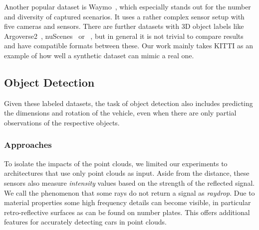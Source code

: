 Another popular dataset is Waymo~\cite{sun_scalability_2020}, which especially stands out for the number and diversity of captured scenarios. It uses a rather complex sensor setup with five cameras and \li sensors. 
There are further datasets with 3D object labels like Argoverse2~\cite{wilson_argoverse_2023}, nuScenes~\cite{caesar_nuscenes_2020} or ~\cite{mao_one_2021}, but in general it is not trivial to compare results and have compatible formats between these. 
Our work mainly takes KITTI as an example of how well a synthetic dataset can mimic a real one.%


\subsection{Object Detection}
Given these labeled datasets, the task of object detection also includes predicting the dimensions and rotation of the vehicle, even when there are only partial observations of the respective objects. 
\subsubsection{Approaches}
To isolate the impacts of the point clouds, we limited our experiments to architectures that use only \li point clouds as input.
Aside from the distance, these sensors also measure \emph{intensity} values based on the strength of the reflected signal.
We call the phenomenon that some rays do not return a signal as \emph{raydrop}.
Due to material properties some high frequency details can become visible, in particular retro-reflective surfaces as can be found on number plates.
This offers additional features for accurately detecting cars in point clouds.

